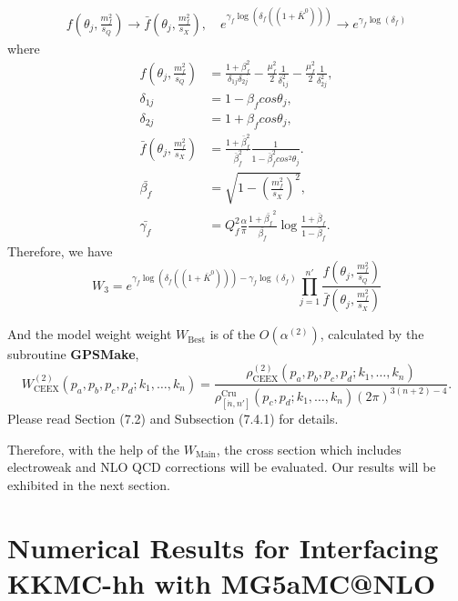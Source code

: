 \begin{align}
 f \left(\theta_j,\frac{m^2_f}{s_Q}\right) \longrightarrow \bar{f}\left(\theta_j,\frac{m^2_f}{s_X}\right), \quad e^{\gamma_f \log(\delta_f((1+\bar{K}^0)))} \longrightarrow e^{\gamma_f \log (\delta_f)}
\end{align}
where
\begin{align}
 f(\theta_j,\frac{m^2_f}{s_Q})&=\frac{1+\beta_f^2}{\delta_{1j}\delta_{2j}}-\frac{\mu_f^2}{2}\frac{1}{\delta_{1j}^2}-\frac{\mu_f^2}{2}\frac{1}{\delta_{2j}^2},\nonumber\\
 \delta_{1j}&=1-\beta_f cos\theta_j,\nonumber\\
 \delta_{2j}&=1+\beta_f cos\theta_j,\nonumber\\
  \bar{f}(\theta_j,\frac{m_f^2}{s_X})&=\frac{1+\bar{\beta}_f^2}{\bar{\beta}_f^2}\frac{1}{1-\bar{\beta}_f^2 cos^2\theta_j}.\nonumber\\
  \bar{\beta_f}&=\sqrt{1-\left(\frac{m_f^2}{s_X}\right)^2},\nonumber\\
  \bar{\gamma_f}&=Q_f^2 \frac{\alpha}{\pi} \frac{1+\bar{\beta_f}^2}{\bar{\beta_f}}\log\frac{1+\bar{\beta}_f}{1-\bar{\beta}_f}.
\end{align}
Therefore, we have
 \begin{equation}
 W_3=e^{\gamma_f \log(\delta_f((1+\bar{K}^0)))-\gamma_f \log (\delta_f)}\prod_{j=1}^{n'}\frac{f\left(\theta_j,\frac{m_f^2}{s_Q}\right)}{\bar{f}\left(\theta_j,\frac{m_f^2}{s_X}\right)}
 \end{equation}

 And the model weight weight $W_\text{Best}$ is of the $O(\alpha^{(2)})$, calculated by the subroutine \textbf{GPS\textunderscore Make},
\begin{equation}
W^{(2)}_\text{CEEX}(p_a,p_b,p_c,p_d;k_1,\ldots,k_{n})=\frac{\rho^{(2)}_\text{CEEX}(p_a,p_b,p_c,p_d;k_1,\ldots,k_{n})}{\rho_{[\dot{n},n']}^\text{Cru}(p_c,p_d;k_1,\ldots,k_{n})(2\pi)^{3(n+2)-4}}.
\end{equation}
 Please read Section (7.2) and Subsection (7.4.1) for details.
 
 Therefore, with the help of the $W_\text{Main}$, the cross section which includes electroweak and NLO QCD corrections will be evaluated. Our results will be exhibited in the next section.
 
\section{Numerical Results for Interfacing KKMC-hh with MG5\textunderscore aMC@NLO} 
 
